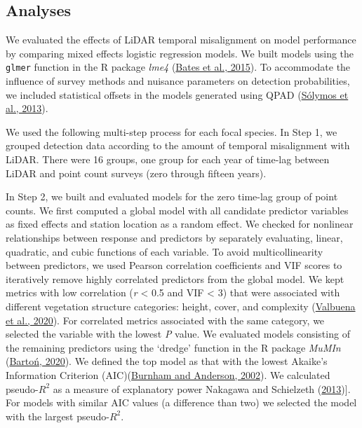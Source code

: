\documentclass[
]{article}
\begin{document}
\hypertarget{analyses}{%
\subsection{Analyses}\label{analyses}}

We evaluated the effects of LiDAR temporal misalignment on model performance by comparing mixed effects logistic regression models. We built models using the \texttt{glmer} function in the R package \emph{lme4} (\protect\hyperlink{ref-batesFittingLinearMixedeffects2015}{Bates et al., 2015}). To accommodate the influence of survey methods and nuisance parameters on detection probabilities, we included statistical offsets in the models generated using QPAD (\protect\hyperlink{ref-SolymosMatsuoka2013}{Sólymos et al., 2013}).

We used the following multi-step process for each focal species. In Step 1, we grouped detection data according to the amount of temporal misalignment with LiDAR. There were 16 groups, one group for each year of time-lag between LiDAR and point count surveys (zero through fifteen years).

In Step 2, we built and evaluated models for the zero time-lag group of point counts. We first computed a global model with all candidate predictor variables as fixed effects and station location as a random effect. We checked for nonlinear relationships between response and predictors by separately evaluating, linear, quadratic, and cubic functions of each variable. To avoid multicollinearity between predictors, we used Pearson correlation coefficients and VIF scores to iteratively remove highly correlated predictors from the global model. We kept metrics with low correlation (\emph{r} \textless{} 0.5 and VIF \textless{} 3) that were associated with different vegetation structure categories: height, cover, and complexity (\protect\hyperlink{ref-valbuenaStandardizingEcosystemMorphological2020}{Valbuena et al., 2020}). For correlated metrics associated with the same category, we selected the variable with the lowest \emph{P} value. We evaluated models consisting of the remaining predictors using the `dredge' function in the R package \emph{MuMIn} (\protect\hyperlink{ref-bartonMuMInMultimodelInference2020}{Bartoń, 2020}). We defined the top model as that with the lowest Akaike's Information Criterion (AIC)(\protect\hyperlink{ref-burnhamModelSelectionMultimodel2002}{Burnham and Anderson, 2002}). We calculated pseudo-\(R^2\) as a measure of explanatory power Nakagawa and Schielzeth (\protect\hyperlink{ref-nakagawaGeneralSimpleMethod2013}{2013}){]}. For models with similar AIC values (a difference than two) we selected the model with the largest pseudo-\(R^2\).
\end{document}
